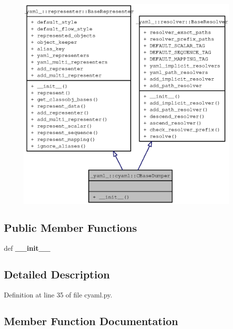 \begin{figure}[H]
\begin{center}
\leavevmode
\includegraphics[width=400pt]{class__yaml___1_1cyaml_1_1CBaseDumper__coll__graph}
\end{center}
\end{figure}
\subsection*{Public Member Functions}
\begin{CompactItemize}
\item 
def {\bf \_\-\_\-init\_\-\_\-}
\end{CompactItemize}


\subsection{Detailed Description}


Definition at line 35 of file cyaml.py.

\subsection{Member Function Documentation}
